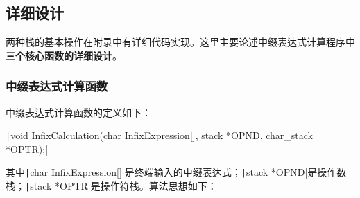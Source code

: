 \documentclass[10pt,a4paper]{article}
\begin{document}
	\subsection{详细设计}
	\noindent 两种栈的基本操作在附录中有详细代码实现。这里主要论述中缀表达式计算程序中\textbf{三个核心函数的详细设计}。
	\subsubsection{中缀表达式计算函数}
	\noindent 中缀表达式计算函数的定义如下：
	\begin{center}
		\texttt|void InfixCalculation(char InfixExpression[], stack *OPND, char_stack *OPTR);|
	\end{center}
	其中\texttt|char InfixExpression[]|是终端输入的中缀表达式；\texttt|stack *OPND|是操作数栈；\texttt|stack *OPTR|是操作符栈。算法思想如下：
\end{document}
